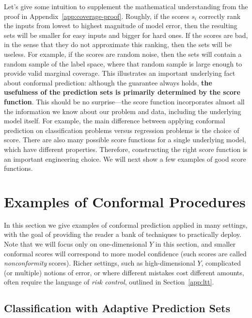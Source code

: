 \documentclass[10pt]{article}
\begin{document}
Let's give some intuition to supplement the mathematical understanding from the proof in Appendix~\ref{app:coverage-proof}.
Roughly, if the scores $s_i$ correctly rank the inputs from lowest to highest magnitude of model error, then the resulting sets will be smaller for easy inputs and bigger for hard ones.
If the scores are bad, in the sense that they do not approximate this ranking, then the sets will be useless.
For example, if the scores are random noise, then the sets will contain a random sample of the label space, where that random sample is large enough to provide valid marginal coverage.
This illustrates an important underlying fact about conformal prediction: although the guarantee always holds, \textbf{the usefulness of the prediction sets is primarily determined by the score function}.
This should be no surprise---the score function incorporates almost all the information we know about our problem and data, including the underlying model itself.
For example, the main difference between applying conformal prediction on classification problems versus regression problems is the choice of score.
There are also many possible score functions for a single underlying model, which have different properties. Therefore, constructing the right score function is an important engineering choice.
We will next show a few examples of good score functions.

\section{Examples of Conformal Procedures}
\label{sec:examples-conformal}
In this section we give examples of conformal prediction applied in many settings, with the goal of providing the reader a bank of techniques to practically deploy.
Note that we will focus only on one-dimensional $Y$ in this section, and smaller conformal scores will correspond to more model confidence (such scores are called \textit{nonconformity} scores). 
Richer settings, such as high-dimensional $Y$, complicated (or multiple) notions of error, or where different mistakes cost different amounts, often require the language of \emph{risk control}, outlined in Section~\ref{app:ltt}.

\subsection{Classification with Adaptive Prediction Sets}
\label{subsec:aps}
\end{document}
